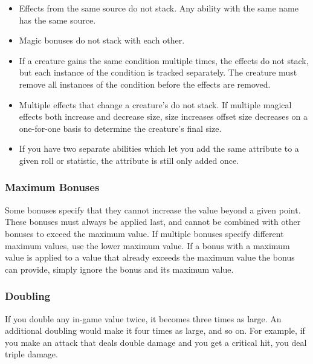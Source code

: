            \begin{itemize}
                \item Effects from the same source do not stack. Any ability with the same name has the same source.
                \item Magic bonuses do not stack with each other.
                \item If a creature gains the same condition multiple times, the effects do not stack, but each instance of the condition is tracked separately.
                    The creature must remove all instances of the condition before the effects are removed.
                \item Multiple  effects that change a creature's  do not stack.
                    If multiple magical effects both increase and decrease size, size increases offset size decreases on a one-for-one basis to determine the creature's final size.
                \item If you have two separate abilities which let you add the same attribute to a given roll or statistic, the attribute is still only added once.
            \end{itemize}

        \subsubsection{Maximum Bonuses}\label{Ability Limits}
            Some bonuses specify that they cannot increase the value beyond a given point.
            These bonuses must always be applied last, and cannot be combined with other bonuses to exceed the maximum value.
            If multiple bonuses specify different maximum values, use the lower maximum value.
            If a bonus with a maximum value is applied to a value that already exceeds the maximum value the bonus can provide, simply ignore the bonus and its maximum value.

        \subsubsection{Doubling}\label{Doubling}
            If you double any in-game value twice, it becomes three times as large. An additional doubling would make it four times as large, and so on. For example, if you make an attack that deals double damage and you get a critical hit, you deal triple damage.

